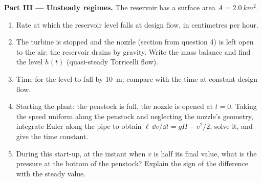 \begin{problem}
\medskip
\noindent\textbf{Part III --- Unsteady regimes.}
The reservoir has a surface area $A = \qty{2.0}{km^2}$.
\begin{enumerate}[resume]
  \item Rate at which the reservoir level falls at design flow, in
        centimetres per hour.
  \item The turbine is stopped and the nozzle (section from question 4)
        is left open to the air: the reservoir drains by gravity. Write
        the mass balance and find the level $h(t)$ (quasi-steady
        Torricelli flow).
  \item Time for the level to fall by \qty{10}{m}; compare with the time
        at constant design flow.
  \item Starting the plant: the penstock is full, the nozzle is opened
        at $t = 0$. Taking the speed uniform along the penstock and
        neglecting the nozzle's geometry, integrate Euler along the
        pipe to obtain $\ell\,\dd v/\dd t = gH - v^2/2$, solve it, and give
        the time constant.
  \item During this start-up, at the instant when $v$ is half its final
        value, what is the pressure at the bottom of the penstock?
        Explain the sign of the difference with the steady value.
\end{enumerate}


\end{problem}
